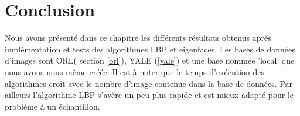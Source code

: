 \section{Conclusion}
Nous avons présenté dans ce chapitre les différents résultats obtenus après implémentation et tests des algorithmes LBP et eigenfaces. Les bases de données d'images sont ORL( section \ref{orl}), YALE (\ref{yale}) et une base nommée 'local' que nous avons nous même créée. Il est à noter que le temps d'exécution des algorithmes croît avec le nombre d'image contenue dans la base de données. Par ailleurs l'algorithme LBP s'avère un peu plus rapide et est mieux adapté pour le problème à un échantillon.
\nocite{TRACK}